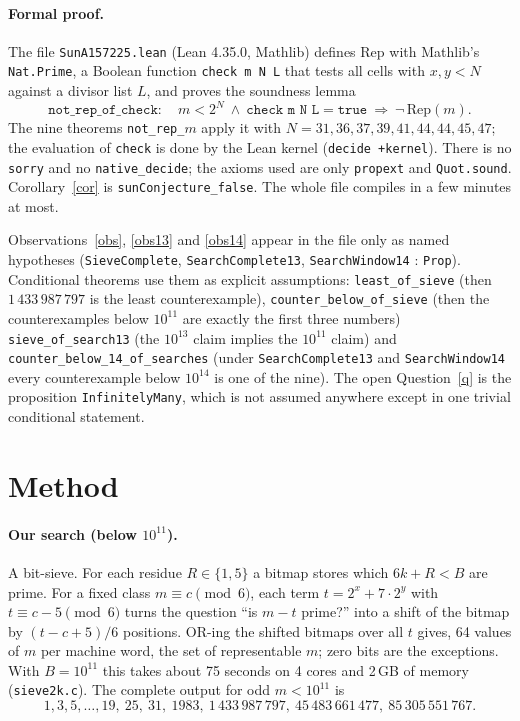 \documentclass[11pt,a4paper]{article}
\theoremstyle{definition}\newtheorem{definition}[theorem]{Definition}
\theoremstyle{remark}\newtheorem{remark}[theorem]{Remark}
\newcommand{\Rep}{\mathrm{Rep}}
\begin{document}
\paragraph{Formal proof.} The file \texttt{SunA157225.lean} (Lean 4.35.0, Mathlib) defines
$\Rep$ with Mathlib's \texttt{Nat.Prime}, a Boolean function \texttt{check m N L} that tests all cells with $x,y<N$
against a divisor list $L$, and proves the soundness lemma
\[\texttt{not\_rep\_of\_check}:\quad m<2^N\ \wedge\ \texttt{check m N L}=\texttt{true}\ \Longrightarrow\ \neg\,\Rep(m).\]
The nine theorems \texttt{not\_rep\_}$m$ apply it with $N=31,36,37,39,41,44,44,45,47$; the evaluation of \texttt{check} is done by the Lean kernel (\texttt{decide +kernel}).
There is no \texttt{sorry} and no \texttt{native\_decide}; the axioms used are only \texttt{propext} and
\texttt{Quot.sound}. Corollary~\ref{cor} is \texttt{sunConjecture\_false}. The whole file compiles in a few minutes at most.

Observations~\ref{obs}, \ref{obs13} and \ref{obs14} appear in the file only as named hypotheses
(\texttt{SieveComplete}, \texttt{SearchComplete13}, \texttt{SearchWindow14} : \texttt{Prop}). Conditional theorems use them as explicit
assumptions: \texttt{least\_of\_sieve} (then $1\,433\,987\,797$ is the least counterexample),
\texttt{counter\_below\_of\_sieve} (then the counterexamples below $10^{11}$ are exactly the first three numbers)
\texttt{sieve\_of\_search13} (the $10^{13}$ claim implies the $10^{11}$ claim) and
\texttt{counter\_below\_14\_of\_searches} (under \texttt{SearchComplete13} and \texttt{SearchWindow14} every
counterexample below $10^{14}$ is one of the nine). The open Question~\ref{q} is the proposition
\texttt{InfinitelyMany}, which is not assumed anywhere except in one trivial conditional statement.

\section{Method}\label{sec:method}
\paragraph{Our search (below $10^{11}$).} A bit-sieve. For each residue $R\in\{1,5\}$ a bitmap stores which $6k+R<B$ are prime.
For a fixed class $m\equiv c\pmod 6$, each term $t=2^x+7\cdot 2^y$ with $t\equiv c-5 \pmod 6$ turns the question
``is $m-t$ prime?'' into a shift of the bitmap by $(t-c+5)/6$ positions. OR-ing the shifted bitmaps over all $t$
gives, 64 values of $m$ per machine word, the set of representable $m$; zero bits are the exceptions. With
$B=10^{11}$ this takes about 75 seconds on 4 cores and 2\,GB of memory (\texttt{sieve2k.c}). The complete output
for odd $m<10^{11}$ is
\[1,3,5,\dots,19,\ 25,\ 31,\ 1983,\ 1\,433\,987\,797,\ 45\,483\,661\,477,\ 85\,305\,551\,767 .\]
\end{document}
